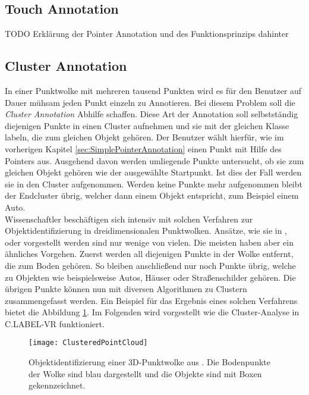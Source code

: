 \subsection{Touch Annotation}
\label{sec:TouchAnnotation}
TODO Erklärung der Pointer Annotation und des Funktionsprinzips dahinter

\subsection{Cluster Annotation}
\label{sec:ClusterLabeling}
In einer Punktwolke mit mehreren tausend Punkten wird es für den Benutzer auf Dauer mühsam jeden Punkt einzeln zu Annotieren. Bei diesem Problem soll die \textit{Cluster Annotation} Abhilfe schaffen. Diese Art der Annotation soll selbstständig diejenigen Punkte in einen Cluster aufnehmen und sie mit der gleichen Klasse labeln, die zum gleichen Objekt gehören. Der Benutzer wählt hierfür, wie im vorherigen Kapitel \ref{sec:SimplePointerAnnotation} einen Punkt mit Hilfe des Pointers aus. Ausgehend davon werden umliegende Punkte untersucht, ob sie zum gleichen Objekt gehören wie der ausgewählte Startpunkt. Ist dies der Fall werden sie in den Cluster aufgenommen. Werden keine Punkte mehr aufgenommen bleibt der Endcluster übrig, welcher dann einem Objekt entspricht, zum Beispiel einem Auto. \\

Wissenschaftler beschäftigen sich intensiv mit solchen Verfahren zur Objektidentifizierung in dreidimensionalen Punktwolken. Ansätze, wie sie in \cite{bib:Segmentation1}, \cite{bib:Segmentation2} oder \cite{bib:Segmentation3} vorgestellt werden sind nur wenige von vielen. Die meisten haben aber ein ähnliches Vorgehen. Zuerst werden all diejenigen Punkte in der Wolke entfernt, die zum Boden gehören. So bleiben anschließend nur noch Punkte übrig, welche zu Objekten wie beispielsweise Autos, Häuser oder Straßenschilder gehören. Die übrigen Punkte können nun mit diversen Algorithmen zu Clustern zusammengefasst werden. Ein Beispiel für das Ergebnis eines solchen Verfahrens bietet die Abbildung \ref{fig:ClusteredCloud}. Im Folgenden wird vorgestellt wie die Cluster-Analyse in C.LABEL-VR funktioniert.

\begin{figure}%
	\centering
    \texttt{[image: ClusteredPointCloud]}
    \caption{Objektidentifizierung einer 3D-Punktwolke aus \cite{bib:Segmentation1}. Die Bodenpunkte der Wolke sind blau dargestellt und die Objekte sind mit Boxen gekennzeichnet.}
    \label{fig:ClusteredCloud}
\end{figure}

